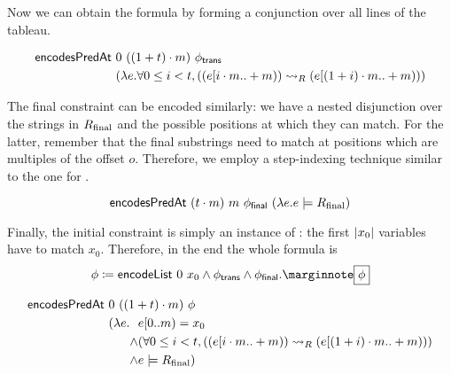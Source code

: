 Now we can obtain the formula  by forming a conjunction over all lines of the tableau.
\begin{lemma}
  \begin{align*}
    \textsf{encodesPredAt}~&0~((1 +{t}) \cdot m)~\phi_{\textsf{trans}} \\
                                                   &(\lambda e. \forall 0 \le i < t, ((e[i \cdot m..+m)) \rightsquigarrow_{R} (e[(1 +{i}) \cdot m ..+m)))
  \end{align*}
\end{lemma}


The final constraint can be encoded similarly: we have a nested disjunction over the strings in $R_{\text{final}}$ and the possible positions at which they can match. For the latter, remember that the final substrings need to match at positions which are multiples of the offset $o$. Therefore, we employ a step-indexing technique similar to the one for \encodeWindowsLine. 

\begin{lemma}
  \[\textsf{encodesPredAt}~(t \cdot m)~m~\phi_{\textsf{final}}~(\lambda e. e \models R_{\text{final}}) \]
\end{lemma}

Finally, the initial constraint is simply an instance of \encodeList: the first $|x_0|$ variables have to match $x_0$. 
Therefore, in the end the whole formula is
\[ \phi \defeq \encodeList~0~x_0 \land \phi_{\textsf{trans}} \land \phi_{\textsf{final}}.\mnote{$\phi$} \]

\begin{lemma}\label{lem:phi_correct}
  \begin{align*}
    \textsf{encodesPredAt}~&0~((1 +{t}) \cdot m)~\phi \\
                 &(\lambda e. \begin{aligned}[t]
                  &e[0..m) = x_0 \\
                   \land &  (\forall 0 \le i < t, ((e[i \cdot m..+m)) \rightsquigarrow_{R} (e[(1 +{i}) \cdot m..+m))) \\
                  \land & e \models R_{\text{final}})
                \end{aligned}
  \end{align*}
\end{lemma}

